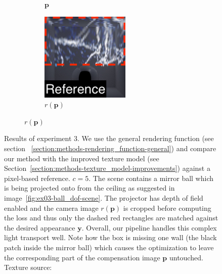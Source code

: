 \begin{figure}[]
\begin{subfigure}{\textwidth}
\begin{subfigure}{0.19\textwidth}
            \caption*{\(\bm{p}\)}
        \end{subfigure}
        \hfill
        \begin{subfigure}{0.19\textwidth}
            \centering
            \includegraphics[width=\textwidth]{images/04-experiment03/ball_dof/marble/pixel_proj_highlighted2.jpg}
            \caption*{\(r(\bm{p})\)}
        \end{subfigure}
    \end{subfigure}
    \caption{Results of experiment 3. We use the general rendering function (see section ~\ref{section:methods-rendering_function-general}) and compare our method with the improved texture model (see Section~\ref{section:methods-texture_model-improvements}) against a pixel-based reference. \(c = 5\). The scene contains a mirror ball which is being projected onto from the ceiling as suggested in image~\ref{fig:ex03-ball_dof-scene}. The projector has depth of field enabled and the camera image \(r(\bm{p})\) is cropped before computing the loss and thus only the dashed red rectangles are matched against the desired appearance \(\bm{y}\). Overall, our pipeline handles this complex light transport well. Note how the box is missing one wall (the black patch inside the mirror ball) which causes the optimization to leave the corresponding part of the compensation image \(\bm{p}\) untouched. Texture source: \citet{Pixar128}}
    \label{fig:ex03-ball_dof}
\end{figure}


